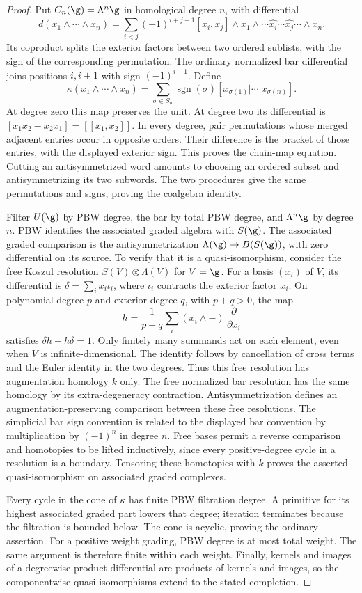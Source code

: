 \begin{proof}
Put $C_n(\g)=\Lambda^n\g$ in homological degree $n$, with differential
\[
 d(x_1\wedge\cdots\wedge x_n)
 =\sum_{i<j}(-1)^{i+j+1}[x_i,x_j]\wedge
 x_1\wedge\cdots\widehat{x_i}\cdots\widehat{x_j}\cdots\wedge x_n.
\]
Its coproduct splits the exterior factors between two ordered sublists,
with the sign of the corresponding permutation.
The ordinary normalized bar differential joins positions $i,i+1$ with sign $(-1)^{i-1}$.
Define
\[
 \kappa(x_1\wedge\cdots\wedge x_n)
 =\sum_{\sigma\in S_n}\operatorname{sgn}(\sigma)
 [x_{\sigma(1)}|\cdots|x_{\sigma(n)}].
\]
At degree zero this map preserves the unit.
At degree two its differential is $[x_1x_2-x_2x_1]=[[x_1,x_2]]$.
In every degree, pair permutations whose merged adjacent entries occur in opposite orders.
Their difference is the bracket of those entries, with the displayed exterior sign.
This proves the chain-map equation.
Cutting an antisymmetrized word amounts to choosing an ordered subset and
antisymmetrizing its two subwords.
The two procedures give the same permutations and signs, proving the coalgebra identity.

Filter $U(\g)$ by PBW degree, the bar by total PBW degree, and $\Lambda^n\g$ by degree $n$.
PBW identifies the associated graded algebra with $S(\g)$.
The associated graded comparison is the antisymmetrization
$\Lambda(\g)\to B(S(\g))$, with zero differential on its source.
To verify that it is a quasi-isomorphism, consider the free Koszul resolution
$S(V)\otimes\Lambda(V)$ for $V=\g$.
For a basis $(x_i)$ of $V$, its differential is
$\delta=\sum_i x_i\iota_i$, where $\iota_i$ contracts the exterior factor $x_i$.
On polynomial degree $p$ and exterior degree $q$, with $p+q>0$, the map
\[
 h=\frac{1}{p+q}\sum_i (x_i\wedge -)\,\frac{\partial}{\partial x_i}
\]
satisfies $\delta h+h\delta=1$.
Only finitely many summands act on each element, even when $V$ is infinite-dimensional.
The identity follows by cancellation of cross terms and the Euler identity in the two degrees.
Thus this free resolution has augmentation homology $k$ only.
The free normalized bar resolution has the same homology by its extra-degeneracy contraction.
Antisymmetrization defines an augmentation-preserving comparison between these free resolutions.
The simplicial bar sign convention is related to the displayed bar convention by multiplication by $(-1)^n$ in degree $n$.
Free bases permit a reverse comparison and homotopies to be lifted inductively,
since every positive-degree cycle in a resolution is a boundary.
Tensoring these homotopies with $k$ proves the asserted quasi-isomorphism on associated graded complexes.

Every cycle in the cone of $\kappa$ has finite PBW filtration degree.
A primitive for its highest associated graded part lowers that degree;
iteration terminates because the filtration is bounded below.
The cone is acyclic, proving the ordinary assertion.
For a positive weight grading, PBW degree is at most total weight.
The same argument is therefore finite within each weight.
Finally, kernels and images of a degreewise product differential are products of kernels and images,
so the componentwise quasi-isomorphisms extend to the stated completion.
\end{proof}

